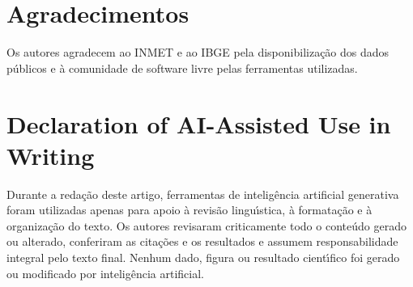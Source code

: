 \documentclass{RITA}
\begin{document}
\section*{Agradecimentos}

Os autores agradecem ao INMET e ao IBGE pela disponibiliza\c{c}\~ao dos dados p\'ublicos e \`a comunidade de software livre pelas ferramentas utilizadas.

\section*{Declaration of AI-Assisted Use in Writing}
Durante a reda\c{c}\~ao deste artigo, ferramentas de intelig\^encia artificial generativa foram utilizadas apenas para apoio \`a revis\~ao lingu\'\i stica, \`a formata\c{c}\~ao e \`a organiza\c{c}\~ao do texto. Os autores revisaram criticamente todo o conte\'udo gerado ou alterado, conferiram as cita\c{c}\~oes e os resultados e assumem responsabilidade integral pelo texto final. Nenhum dado, figura ou resultado cient\'\i fico foi gerado ou modificado por intelig\^encia artificial.


\end{document}
